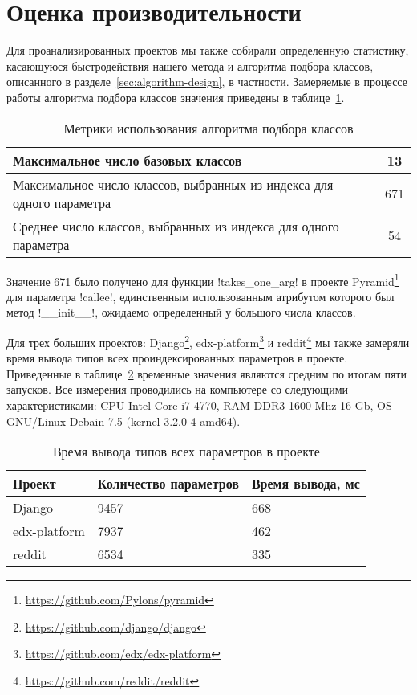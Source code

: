 
\newpage

\section{Оценка производительности}
\label{sec:performance-evaluation}

Для проанализированных проектов мы также собирали определенную статистику,
касающуюся быстродействия нашего метода и алгоритма подбора классов, описанного
в разделе~\ref{sec:algorithm-design}, в частности. Замеряемые в процессе работы
алгоритма подбора классов значения приведены в таблице~\ref{tab:performance-metrics}.

\begin{table}[H]
  \small
  \centering
  \caption{Метрики использования алгоритма подбора классов}
  \label{tab:performance-metrics}
    \begin{tabularx}{\textwidth}{|X|c|}
      \hline
      Максимальное число базовых классов & 13
      \\ \hline
      Максимальное число классов, выбранных из индекса для одного параметра & 671
      \\ \hline
      Среднее число классов, выбранных из индекса для одного параметра & 54
      \\ \hline
    \end{tabularx}
\end{table}

Значение 671 было получено для функции !takes_one_arg! в проекте
Pyramid\footnote{\url{https://github.com/Pylons/pyramid}} для
параметра !callee!, единственным использованным атрибутом которого был
метод !__init__!, ожидаемо определенный у большого числа классов.

Для трех больших проектов: Django\footnote{\url{https://github.com/django/django}},
edx-platform\footnote{\url{https://github.com/edx/edx-platform}} и
reddit\footnote{\url{https://github.com/reddit/reddit}} мы также замеряли
время вывода типов всех проиндексированных параметров в проекте. Приведенные в
таблице~\ref{tab:performance-evaluation} временные значения являются средним по
итогам пяти запусков. Все измерения проводились на компьютере со следующими 
характеристиками: CPU Intel Core i7-4770, RAM DDR3 1600 Mhz 16 Gb, OS GNU/Linux
Debain 7.5 (kernel 3.2.0-4-amd64).

\begin{table}[H]
  \small
  \centering
  \caption{Время вывода типов всех параметров в проекте}
  \label{tab:performance-evaluation}
    \begin{tabularx}{\textwidth}{|X|X|X|}
      \hline
      Проект & Количество параметров & Время вывода, мс
      \\ \hline
      Django & 9457 & 668 
      \\ \hline
      edx-platform & 7937 & 462
      \\ \hline
      reddit & 6534 & 335
      \\ \hline
    \end{tabularx}
\end{table}




